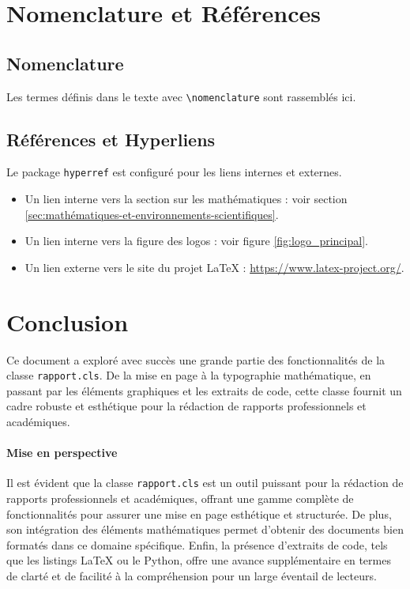 \documentclass{butex}
\begin{document}
\section{Nomenclature et Références}

\subsection{Nomenclature}
Les termes définis dans le texte avec \verb|\nomenclature| sont rassemblés ici.
\printnomenclature

\subsection{Références et Hyperliens}
Le package \texttt{hyperref} est configuré pour les liens internes et externes.
\begin{itemize}
	\item Un lien interne vers la section sur les mathématiques : voir section \ref{sec:mathématiques-et-environnements-scientifiques}.
	\item Un lien interne vers la figure des logos : voir figure \ref{fig:logo_principal}.
	\item Un lien externe vers le site du projet LaTeX : \url{https://www.latex-project.org/}.
\end{itemize}

\section{Conclusion}

Ce document a exploré avec succès une grande partie des fonctionnalités de la classe \texttt{rapport.cls}. De la mise en page à la typographie mathématique, en passant par les éléments graphiques et les extraits de code, cette classe fournit un cadre robuste et esthétique pour la rédaction de rapports professionnels et académiques.

\paragraph*{Mise en perspective}
Il est évident que la classe \texttt{rapport.cls} est un outil puissant pour la rédaction de rapports professionnels et académiques, offrant une gamme complète de fonctionnalités pour assurer une mise en page esthétique et structurée. De plus, son intégration des éléments mathématiques permet d'obtenir des documents bien formatés dans ce domaine spécifique. Enfin, la présence d'extraits de code, tels que les listings LaTeX ou le Python, offre une avance supplémentaire en termes de clarté et de facilité à la compréhension pour un large éventail de lecteurs.

\merci
\end{document}
